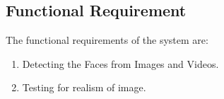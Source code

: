 \subsection{Functional Requirement}
The functional requirements of the system are:
\begin{enumerate}
    \item Detecting the Faces from Images and Videos.
    \item Testing for realism of image.
\end{enumerate}